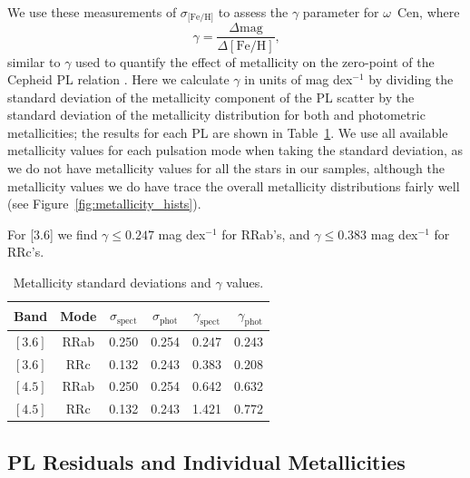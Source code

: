 \documentclass[a4paper,fleqn,usenatbib]{mnras}
\begin{document}
We use these measurements of $\sigma_\text{[Fe/H]}$ to assess the $\gamma$ parameter for $\omega$~Cen, where 
\begin{equation} \label{eqn:gamma}
\gamma = \dfrac {\Delta \text{mag}} {\Delta [\text{Fe/H}]}\text{,}
\end{equation}
similar to $\gamma$ used to quantify the effect of metallicity on the zero-point of the Cepheid PL relation \citep{1998ApJ...498..181K, 2009MNRAS.396.1287S}. Here we calculate $\gamma$ in units of mag dex$^{-1}$ by dividing the standard deviation of the metallicity component of the PL scatter by the standard deviation of the metallicity distribution for both \citep{2006ApJ...640L..43S} and photometric \citep{2000AJ....119.1824R} metallicities; the results for each PL are shown in Table~\ref{tab:gamma}. We use all available metallicity values for each pulsation mode when taking the standard deviation, as we do not have metallicity values for all the stars in our samples, although the metallicity values we do have trace the overall metallicity distributions fairly well (see Figure~\ref{fig:metallicity_hists}).

For [3.6] we find $\gamma \leq 0.247$ mag dex$^{-1}$ for RRab's, and $\gamma \leq 0.383$ mag dex$^{-1}$ for RRc's.

\begin{table}
\centering
\caption{Metallicity standard deviations and $\gamma$ values.}
\label{tab:gamma}
\begin{tabular}{lccccr} 
\hline \hline
Band & Mode & $\sigma_{\text{spect}}$ & $\sigma_{\text{phot}}$ & $\gamma_{\text{spect}}$ & $\gamma_{\text{phot}}$ \\
\hline
$[3.6]$ & RRab & 0.250 & 0.254 & 0.247 & 0.243 \\ %
$[3.6]$ & RRc & 0.132 & 0.243 & 0.383 & 0.208 \\ %
$[4.5]$ & RRab & 0.250 & 0.254 & 0.642 & 0.632 \\ %
$[4.5]$ & RRc & 0.132 & 0.243 & 1.421 & 0.772 \\ %
\hline
\end{tabular}
\end{table}

\subsection{PL Residuals and Individual Metallicities}
\label{sec:residuals}
\end{document}
